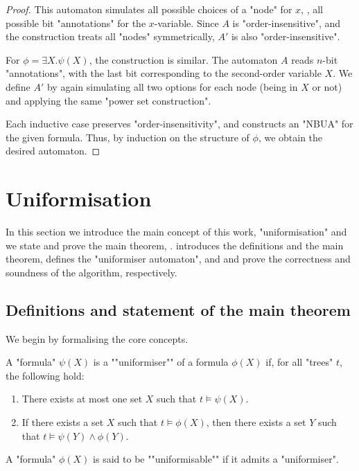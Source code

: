 \documentclass[a4paper,UKenglish,cleveref, autoref, thm-restate]{lipics-v2021}
\begin{document}
\begin{proof}
	This automaton simulates all possible choices of a "node" for $x$, \ie, all possible  bit "annotations" for the $x$-variable.
	Since $A$ is "order-insensitive", and the construction treats all "nodes" symmetrically, $A'$ is also "order-insensitive".

	For $\phi = \exists X.\psi(X)$, the construction is similar. The automaton $A$ reads $n$-bit "annotations", with the last bit corresponding
	to the second-order variable $X$. We define $A'$ by again simulating all two options for each node (being in $X$ or not) and applying the same
	"power set construction".

	Each inductive case preserves "order-insensitivity", and constructs an "NBUA" for the given formula. Thus, by induction on the structure of $\phi$,
	we obtain the desired automaton.
\end{proof}


\section{Uniformisation}\label{sec:uniformisation}
In this section we introduce the main concept of this work, "uniformisation" and we state and prove the main theorem, .
 introduces the definitions and the main theorem,  defines the "uniformiser automaton",
and  and  prove the correctness and soundness of the algorithm, respectively.

\subsection{Definitions and statement of the main theorem}\label{section:uniformisation-definitions}

We begin by formalising the core concepts.

\begin{definition}\label{def:uniformiser}
	\AP A "formula" $\psi(X)$ is a ""uniformiser"" of a formula $\phi(X)$ if, for all "trees" $t$, the following hold:
	\begin{enumerate}
		\item There exists at most one set $X$ such that $t \models \psi(X)$.
		\item If there exists a set $X$ such that $t \models \phi(X)$, then there exists a set $Y$ such that $t \models \psi(Y) \land \phi(Y)$.
	\end{enumerate}
	\AP A "formula" $\phi(X)$ is said to be ""uniformisable"" if it admits a "uniformiser".
\end{definition}
\end{document}
